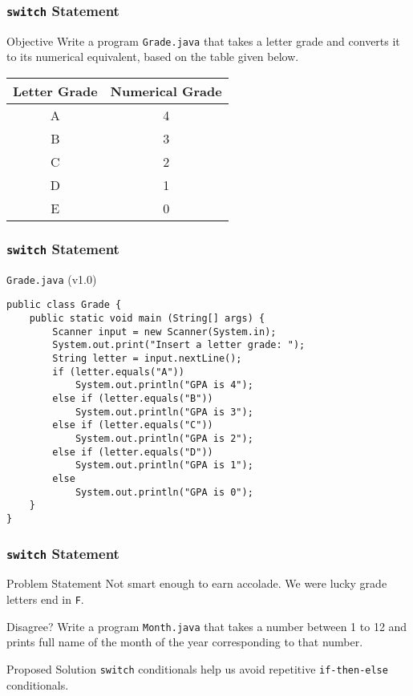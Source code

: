 \documentclass[10pt, compress]{beamer}
\begin{document}
\begin{frame}[fragile]
	\frametitle{\texttt{switch} Statement}
	\begin{block}{Objective}
		Write a program \texttt{Grade.java} that takes a letter grade and converts it to its numerical equivalent, based on the table given below.
		\begin{table}[H]
			\begin{tabular}{c|c}
				Letter Grade & Numerical Grade\\
				\hline
				A & 4\\
				B & 3\\
				C & 2\\
				D & 1\\
				E & 0\\
			\end{tabular}
		\end{table}
	\end{block}
\end{frame}

\begin{frame}[fragile]
	\frametitle{\texttt{switch} Statement}
	\begin{block}{\texttt{Grade.java} (v1.0)}
		\begin{verbatim}
public class Grade {
	public static void main (String[] args) {
		Scanner input = new Scanner(System.in);
		System.out.print("Insert a letter grade: ");
		String letter = input.nextLine();
		if (letter.equals("A"))
			System.out.println("GPA is 4");
		else if (letter.equals("B"))
			System.out.println("GPA is 3");
		else if (letter.equals("C"))
			System.out.println("GPA is 2");
		else if (letter.equals("D"))
			System.out.println("GPA is 1");
		else
			System.out.println("GPA is 0");
	}
}
		\end{verbatim}
	\end{block}
\end{frame}

\begin{frame}[fragile]
	\frametitle{\texttt{switch} Statement}
	\begin{block}{Problem Statement}
	Not smart enough to earn accolade. We were lucky grade letters end in \texttt{F}.
	\end{block}
	\begin{block}{Disagree?}
	Write a program \texttt{Month.java} that takes a number between 1 to 12 and prints full name of the month of the year corresponding to that number.
	\end{block}
	\begin{block}{Proposed Solution}
		\texttt{switch} conditionals help us avoid repetitive \texttt{if-then-else} conditionals.
	\end{block}
\end{frame}
\end{document}
